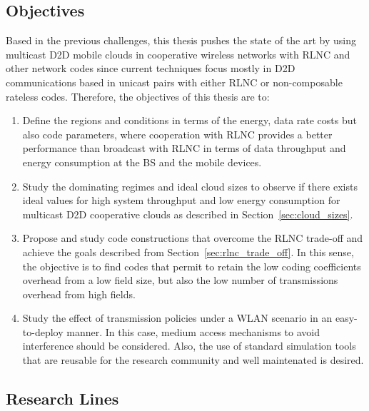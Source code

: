 \subsection{Objectives}
Based in the previous challenges, this thesis pushes the state of the art by using multicast \ac{D2D} mobile clouds in cooperative wireless networks with \ac{RLNC} and other network codes since current techniques focus mostly in \ac{D2D} communications based in unicast pairs with either \ac{RLNC} or non-composable rateless codes. Therefore, the objectives of this thesis are to:

\begin{enumerate}

\item Define the regions and conditions in terms of the energy, data rate costs but also code parameters, where cooperation with \ac{RLNC} provides a better performance than broadcast with \ac{RLNC} in terms of data throughput and energy consumption at the \ac{BS} and the mobile devices.

\item Study the dominating regimes and ideal cloud sizes to observe if there exists ideal values for high system throughput and low energy consumption for multicast \ac{D2D} cooperative clouds as described in Section~\ref{sec:cloud_sizes}.

\item Propose and study code constructions that overcome the \ac{RLNC} trade-off and achieve the goals described from Section~\ref{sec:rlnc_trade_off}. In this sense, the objective is to find codes that permit to retain the low coding coefficients overhead from a low field size, but also the low number of transmissions overhead from high fields.

\item Study the effect of transmission policies under a \ac{WLAN} scenario in an easy-to-deploy manner. In this case, medium access mechanisms to avoid interference should be considered. Also, the use of standard simulation tools that are reusable for the research community and well maintenated is desired.

\end{enumerate}

\subsection{Research Lines}

